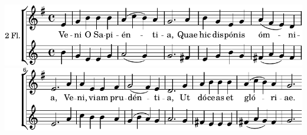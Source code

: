 \includegraphics{5dafb954eafe13786c5b05fa0d09a7f2-1}%
\ifx\betweenLilyPondSystem \undefined
  \linebreak
\else
  \expandafter{}%
\fi
\includegraphics{5dafb954eafe13786c5b05fa0d09a7f2-2}%
